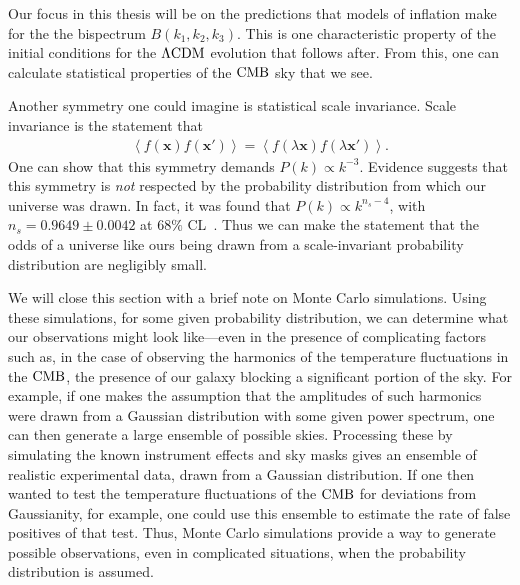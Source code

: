     Our focus in this thesis will be on the predictions that models of inflation make
    for the the bispectrum $B(k_1,k_2,k_3)$.
    This is one characteristic property of 
    the initial conditions for the $\Lambda\text{CDM}$ evolution that follows after. From
    this, one can calculate statistical properties of the $\text{CMB}$ sky that we see.


    Another symmetry one could imagine is statistical scale invariance.
    Scale invariance is the statement that
    \begin{align}
        \left<f(\mathbf{x})f(\mathbf{x'})\right> = \left<f(\lambda\mathbf{x})f(\lambda\mathbf{x'})\right>.
    \end{align}
    One can show that this symmetry demands $P(k)\propto k^{-3}$.
    Evidence suggests that this symmetry is \textit{not} respected by the probability
    distribution from which our universe was drawn.
    In fact, it was found that $P(k)\propto k^{n_s-4}$, with $n_s=0.9649 \pm 0.0042$
    at $68\%$ CL~\cite{Planck_inflation_2015, Planck_inflation_2018}.
    Thus we can make the statement that
    the odds of a universe like ours being drawn from a scale-invariant probability
    distribution are negligibly small.


    We will close this section with a brief note on Monte Carlo simulations.
    Using these simulations, for some given probability distribution, we can determine
    what our observations might look like---even in the presence of
    complicating factors such as, in the case of observing the harmonics of the temperature fluctuations
    in the $\text{CMB}$, the presence of our galaxy blocking a significant portion
    of the sky.
    For example, if one makes the assumption that the amplitudes of
    such harmonics were drawn from a Gaussian distribution with some given power spectrum,
    one can then generate a large ensemble of possible skies.
    Processing these by simulating the known instrument effects and
    sky masks gives an ensemble of realistic experimental data, drawn
    from a Gaussian distribution. If one then wanted to test the temperature
    fluctuations of the $\text{CMB}$ for deviations from Gaussianity,
    for example, one could use this ensemble to estimate the rate of false positives
    of that test.
    Thus, Monte Carlo simulations provide a way to generate possible observations,
    even in complicated situations,
    when the probability distribution is assumed.


